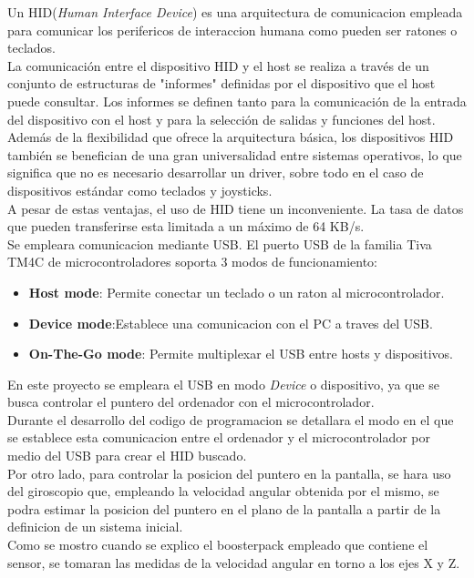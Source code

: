 \documentclass[a4paper,twoside]{article}
\begin{document}
Un HID(\textit{Human Interface Device}) es una arquitectura de comunicacion empleada para comunicar los perifericos de interaccion humana como pueden ser ratones o teclados.\\
La comunicación entre el dispositivo HID y el host se realiza a través de un conjunto de estructuras de "informes" definidas por el dispositivo que el host puede consultar. Los informes se definen tanto para la comunicación de la entrada del dispositivo con el host y para la selección de salidas y funciones del host. \\

Además de la flexibilidad que ofrece la arquitectura básica, los dispositivos HID también se benefician de una gran universalidad entre sistemas operativos, lo que significa que no es necesario desarrollar un driver, sobre todo en el caso de dispositivos estándar como teclados y joysticks.\\
A pesar de estas ventajas, el uso de HID tiene un inconveniente. La tasa de datos que pueden transferirse esta limitada a un máximo de 64 KB/s.\\

Se empleara comunicacion mediante USB. El puerto USB de la familia Tiva TM4C de microcontroladores soporta 3 modos de funcionamiento:
\begin{itemize}
	\item \textbf{Host mode}: Permite conectar un teclado o un raton al microcontrolador.
	\item \textbf{Device mode}:Establece una comunicacion con el PC a traves del USB.
	\item \textbf{On-The-Go mode}: Permite multiplexar el USB entre hosts y dispositivos.
\end{itemize}
En este proyecto se empleara el USB en modo \textit{Device} o dispositivo, ya que se busca controlar el puntero del ordenador con el microcontrolador.\\
Durante el desarrollo del codigo de programacion se detallara el modo en el que se establece esta comunicacion entre el ordenador y el microcontrolador por medio del USB para crear el HID buscado. \\

Por otro lado, para controlar la posicion del puntero en la pantalla, se hara uso del giroscopio que, empleando la velocidad angular obtenida por el mismo, se podra estimar la posicion del puntero en el plano de la pantalla a partir de la definicion de un sistema inicial. \\
Como se mostro cuando se explico el boosterpack empleado que contiene el sensor, se tomaran las medidas de la velocidad angular en torno a los ejes X y Z. \\
\end{document}
